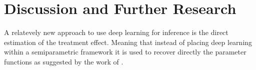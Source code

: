 \section{Discussion and Further Research}





A relatevely new approach to use deep learning for inference is the direct estimation of the treatment effect.
Meaning that instead of placing deep learning within a semiparametric framework it is used to recover directly the parameter functions as suggested by the work of \citet{DeepLearningIndividual2021}.
